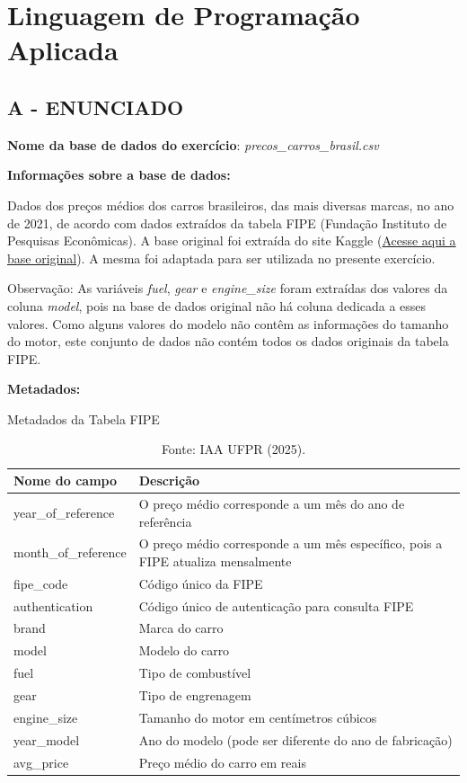 \label{ap:ap02}
\chapter{Linguagem de Programação Aplicada}

\section*{\textbf{A - ENUNCIADO}}
\textbf{Nome da base de dados do exercício}: \textit{precos\_carros\_brasil.csv}

\textbf{Informações sobre a base de dados: }

Dados dos preços médios dos carros brasileiros, das mais diversas marcas, no ano de 2021, de acordo com dados extraídos
da tabela FIPE (Fundação Instituto de Pesquisas Econômicas). A base original foi extraída do site Kaggle
(\href{https://www.kaggle.com/datasets/vagnerbessa/average-car-prices-bazil/data}{\textcolor[HTML]{1155CC}{Acesse aqui
a base original}}). A mesma foi adaptada para ser utilizada no presente exercício.

Observação: As variáveis \textit{fuel\hspace{0pt}\hspace{0pt}}, \textit{gear} e \textit{engine\_size} foram extraídas
dos valores da coluna \textit{model}, pois na base de dados original não há coluna dedicada a esses valores. Como
alguns valores do modelo não contêm as informações do tamanho do motor, este conjunto de dados não contém todos os
dados originais da tabela FIPE.

\textbf{Metadados:}
\begin{table}[H]
\centering
\caption{Metadados da Tabela FIPE}
\begin{tabular}{|p{}|p{}|}
\hline
\textbf{Nome do campo} & \textbf{Descrição} \\
\hline
year\_of\_reference & O preço médio corresponde a um mês do ano de referência \\
\hline
month\_of\_reference & O preço médio corresponde a um mês específico, pois a FIPE atualiza mensalmente \\
\hline
fipe\_code & Código único da FIPE \\
\hline
authentication & Código único de autenticação para consulta FIPE \\
\hline
brand & Marca do carro \\
\hline
model & Modelo do carro \\
\hline
fuel & Tipo de combustível \\
\hline
gear & Tipo de engrenagem \\
\hline
engine\_size & Tamanho do motor em centímetros cúbicos \\
\hline
year\_model & Ano do modelo (pode ser diferente do ano de fabricação) \\
\hline
avg\_price & Preço médio do carro em reais \\
\hline
\end{tabular}
\caption*{Fonte: IAA UFPR (2025).}
\end{table}



